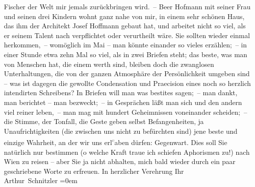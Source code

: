 \begin{ledgroupsized}[t]{13cm}
                    Fischer der Welt mir jemals zurückbringen wird. –\pend
           \pstart
           {\pb}Beer Hofmann mit seiner Frau und seinen drei Kindern wohnt ganz nahe von
                    mir, in einem sehr schönen Haus, das ihm der Architekt Josef
                        Hoffmann gebaut hat, und arbeitet nicht so viel, als er seinem Talent
                    nach verpflichtet oder verurtheilt wäre. Sie sollten wieder einmal herkommen, –
                    womöglich im Mai – man könnte einander so vieles erzählen; – in einer Stunde
                    etwa zehn Mal so viel, als in zwei Briefen steht; das beste, was man von
                    Menschen hat, die einem werth sind, bleiben doch die zwanglosen Unterhaltungen,
                    die von der ganzen Atmosphäre der Persönlichkeit umgeben sind – was ist dagegen
                    die gewollte Condensation und Praecision eines noch so herzlich intendirten
                    Schreibens? {\pb}In Briefen will man was besti{\geminationm}tes sagen; – man dankt, man berichtet – man
                    bezweckt; – in Gesprächen läßt man sich und den andern viel reiner leben, – man
                    mag mit hundert Geheimnissen voneinander scheiden; – die Stimme, der Tonfall,
                    die Geste geben selbst Befangenheiten, ja Unaufrichtigkeiten (die zwischen uns
                    nicht zu befürchten sind) jene beste und einzige Wahrheit, an der wir uns erl\substVorne{}\textsuperscript{\textcolor{gray}{e}}\substDazwischen{}a\substHinten{}ben dürfen: Gegenwart.\pend
           \pstart
           Dies soll Sie natürlich nur bestimmen (o welche Kraft traue ich schiefen
                    Aphorismen zu!) nach Wien zu reisen – aber Sie
                    ja nicht abhalten, mich bald wieder durch ein paar geschriebene Worte zu
                    erfreuen. In herzlicher Verehrung\pend
           \pstart
           Ihr{\\[\baselineskip]}\spacefill\mbox{Arthur Schnitzler}\pend
           \leftskip=0em{}\endnumbering{}\end{ledgroupsized}  \newcommand{\dateiname}{L02000}\newcommand{\titel}{Arthur Schnitzler an Georg Brandes, 19. 1. 1911}\newcommand{\editorInnen}{Martin Anton Müller und Gerd-Hermann Susen}
      